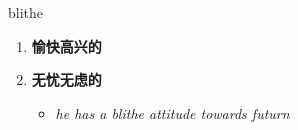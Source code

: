 
\begin{frame}
{\huge blithe}
\begin{center}
\begin{enumerate}\Large
  \item \textbf{愉快高兴的}
  \item \textbf{无忧无虑的}
  \begin{itemize}
    \item \em{\Large{he has a blithe attitude towards futurn}}
  \end{itemize}
\end{enumerate}
\end{center}
\end{frame}
